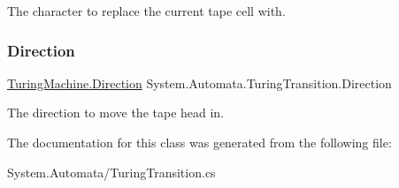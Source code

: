 The character to replace the current tape cell with. 

\mbox{\label{class_system_1_1_automata_1_1_turing_transition_af02531641bd2e8805ad322c253a34660}} 
\subsubsection{\texorpdfstring{Direction}{Direction}}
{\footnotesize\ttfamily \mbox{\hyperlink{class_system_1_1_automata_1_1_turing_machine_aa253c3820befa3cfdd3d17b2d8fdd2d9}{Turing\+Machine.\+Direction}} System.\+Automata.\+Turing\+Transition.\+Direction\hspace{0.3cm}{\ttfamily [get]}}



The direction to move the tape head in. 



The documentation for this class was generated from the following file\+:\begin{DoxyCompactItemize}
\item 
System.\+Automata/Turing\+Transition.\+cs\end{DoxyCompactItemize}
